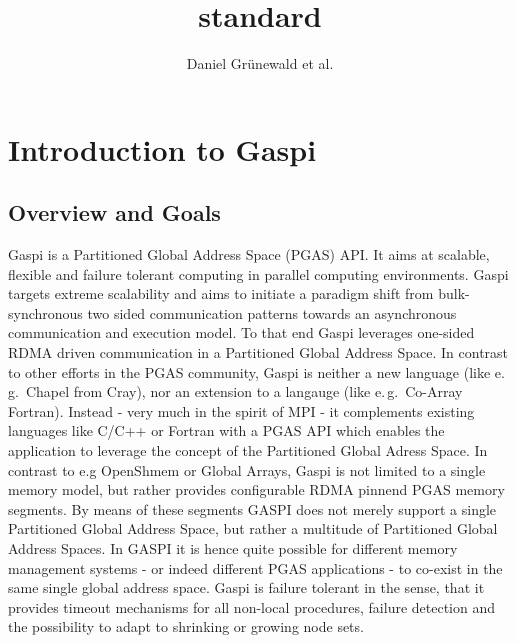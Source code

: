 \documentclass{article}
\title{\GASPI{} standard}
\author{Daniel Gr\"unewald et al.}
\makeatletter
\newlength{\st}\setlength{\st}{0pt}
\newcommand{\GASPI}{{\sc Gaspi}}
\newcounter{counttodo}
\newlength{\savetabcolsep}
\newlength{\savearrayrulewidth}
\newenvironment{todo}
{\stepcounter{counttodo}
 \typeout{Environment TODO call \thecounttodo}
 \setlength{\savetabcolsep}{\tabcolsep}
 \setlength{\savearrayrulewidth}{\arrayrulewidth}
 \renewcommand{\tabcolsep}{0pt}
 \renewcommand{\arrayrulewidth}{2pt}
 \begin{center}
 \begin{tabular}{c|l@{\hspace*{2em}}|@{\hspace*{2em}}c}
 &
 \begin{minipage}{0.66\textwidth}
 \begin{itemize}
}
{\end{itemize}
 \end{minipage}
 &  todo \#\thecounttodo
 \end{tabular} \marginpar{$\Longleftarrow$}
 \end{center}
 \renewcommand{\tabcolsep}{\savetabcolsep}
 \renewcommand{\arrayrulewidth}{\savearrayrulewidth}
}
\makeatother
\begin{document}
\begin{titlepage}
\maketitle
\end{titlepage}

\tableofcontents




\section{Introduction to \GASPI{}}
\label{sec::Intro}


\subsection{Overview and Goals}
\label{subsec::Overview}

\GASPI{} is a Partitioned Global Address Space (PGAS) API. It aims at scalable,
flexible and failure tolerant computing in parallel computing environments.
\GASPI{} targets extreme scalability and aims to initiate a paradigm shift from
bulk-synchronous  two sided communication patterns towards an asynchronous
communication and execution model. To that end \GASPI{} leverages one-sided RDMA
driven communication in a Partitioned Global Address Space. In contrast to other
efforts in the PGAS community, \GASPI{} is neither a new language (like e.\,g.\ Chapel from Cray),
nor an extension to a langauge (like e.\,g.\ Co-Array Fortran). Instead - very much in the spirit of MPI -
it complements existing languages like C/C++ or Fortran with a PGAS API which enables
the application to leverage the concept of the Partitioned Global Adress Space.
In contrast to e.g OpenShmem or Global Arrays, \GASPI{} is not limited to a single
memory model, but rather provides configurable RDMA pinnend PGAS memory segments.
By means of these segments GASPI does not merely support a single Partitioned Global Address Space,
but rather a multitude of Partitioned Global Address Spaces. In GASPI it is hence quite possible
for different memory management systems - or indeed different PGAS applications - to co-exist in
the same single global address space. \GASPI{} is failure tolerant in the sense, that it provides
timeout mechanisms for all non-local procedures, failure detection and the possibility to adapt
to shrinking or growing node sets.
\end{document}
